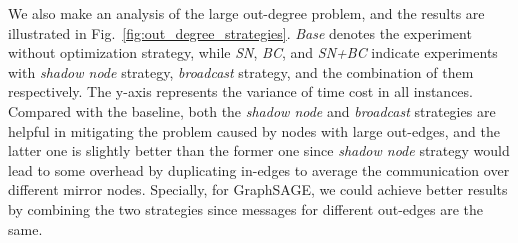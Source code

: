 \documentclass[conference]{IEEEtran}
\begin{document}
We also make an analysis of the large out-degree problem, and the results are illustrated in Fig.~\ref{fig:out_degree_strategies}.
\emph{Base} denotes the experiment without optimization strategy, while \emph{SN}, \emph{BC}, and \emph{SN+BC} indicate experiments with \emph{shadow node} strategy, \emph{broadcast} strategy, and the combination of them respectively.
The y-axis represents the variance of time cost in all instances.
Compared with the baseline, both the \emph{shadow node} and \emph{broadcast} strategies are helpful in mitigating the problem caused by nodes with large out-edges, and the latter one is slightly better than the former one since \emph{shadow node} strategy would lead to some overhead by duplicating in-edges to average the communication over different mirror nodes.
Specially, for GraphSAGE, we could achieve better results by combining the two strategies since messages for different out-edges are the same.
\end{document}
